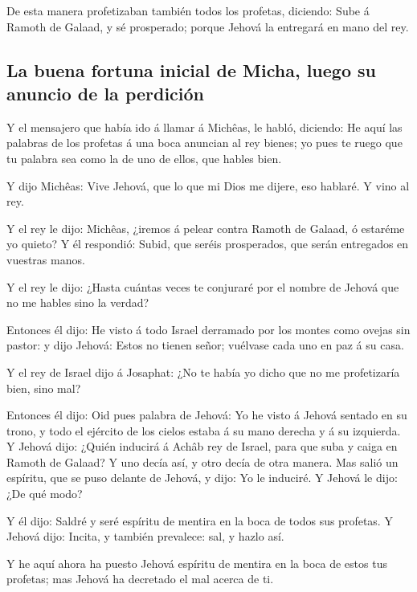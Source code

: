  De esta manera profetizaban también todos los profetas,
diciendo: Sube á Ramoth de Galaad, y sé prosperado; porque Jehová la
entregará en mano del rey.

\hypertarget{la-buena-fortuna-inicial-de-micha-luego-su-anuncio-de-la-perdiciuxf3n}{%
\subsection{La buena fortuna inicial de Micha, luego su anuncio de la
perdición}\label{la-buena-fortuna-inicial-de-micha-luego-su-anuncio-de-la-perdiciuxf3n}}

 Y el mensajero que había ido á llamar á Michêas, le
habló, diciendo: He aquí las palabras de los profetas á una boca
anuncian al rey bienes; yo pues te ruego que tu palabra sea como la de
uno de ellos, que hables bien.

 Y dijo Michêas: Vive Jehová, que lo que mi Dios me
dijere, eso hablaré. Y vino al rey.

 Y el rey le dijo: Michêas, ¿iremos á pelear contra
Ramoth de Galaad, ó estaréme yo quieto? Y él respondió: Subid, que
seréis prosperados, que serán entregados en vuestras manos.

 Y el rey le dijo: ¿Hasta cuántas veces te conjuraré por
el nombre de Jehová que no me hables sino la verdad?

 Entonces él dijo: He visto á todo Israel derramado por
los montes como ovejas sin pastor: y dijo Jehová: Estos no tienen señor;
vuélvase cada uno en paz á su casa.

 Y el rey de Israel dijo á Josaphat: ¿No te había yo
dicho que no me profetizaría bien, sino mal?

 Entonces él dijo: Oid pues palabra de Jehová: Yo he
visto á Jehová sentado en su trono, y todo el ejército de los cielos
estaba á su mano derecha y á su izquierda.  Y Jehová
dijo: ¿Quién inducirá á Achâb rey de Israel, para que suba y caiga en
Ramoth de Galaad? Y uno decía así, y otro decía de otra manera.
 Mas salió un espíritu, que se puso delante de Jehová, y
dijo: Yo le induciré. Y Jehová le dijo: ¿De qué modo?

 Y él dijo: Saldré y seré espíritu de mentira en la boca
de todos sus profetas. Y Jehová dijo: Incita, y también prevalece: sal,
y hazlo así.

 Y he aquí ahora ha puesto Jehová espíritu de mentira en
la boca de estos tus profetas; mas Jehová ha decretado el mal acerca de
ti.

